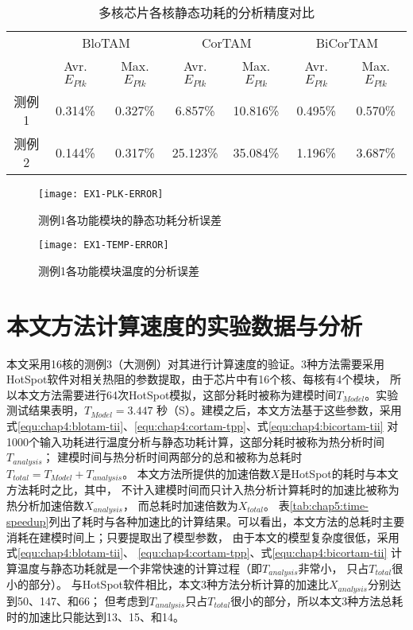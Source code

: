 \begin{table}
\centering
\caption{多核芯片各核静态功耗的分析精度对比}
\begin{tabular}{c c c c c c c}
\hline\hline
 & \multicolumn{2}{c}{BloTAM} & \multicolumn{2}{c}{CorTAM} & \multicolumn{2}{c}{BiCorTAM} \\
 & Avr.$E_{Plk}$ & Max.$E_{Plk}$ & Avr.$E_{Plk}$ & Max.$E_{Plk}$ & Avr.$E_{Plk}$ & Max.$E_{Plk}$ \\
\hline
测例1 & 0.314\% & 0.327\% & 6.857\% & 10.816\% & 0.495\% & 0.570\% \\
\hline
测例2 & 0.144\% & 0.317\% & 25.123\% & 35.084\% & 1.196\% & 3.687\% \\
\hline
\end{tabular}
\label{tab:chap5:power-leakage-error}
\end{table}


\begin{figure}[H]
  \centering
  \texttt{[image: EX1-PLK-ERROR]}
  \caption{测例1各功能模块的静态功耗分析误差}
  \label{fig:ex1-plk-error}
\end{figure}
\begin{figure}[H]
  \centering
  \texttt{[image: EX1-TEMP-ERROR]}
  \caption{测例1各功能模块温度的分析误差}
  \label{fig:ex1-temp-error}
\end{figure}


\section{本文方法计算速度的实验数据与分析}
\label{exp-speedup}
本文采用16核的测例3（大测例）对其进行计算速度的验证。3种方法需要采用HotSpot软件对相关热阻的参数提取，由于芯片中有16个核、每核有4个模块， 所以本文方法需要进行64次HotSpot模拟，这部分耗时被称为建模时间$T_{Model}$。实验测试结果表明，$T_{Model} = 3.447$ 秒（S）。建模之后，本文方法基于这些参数，采用式\ref{equ:chap4:blotam-tii}、\ref{equ:chap4:cortam-tpp}、式\ref{equ:chap4:bicortam-tii} 对1000个输入功耗进行温度分析与静态功耗计算，这部分耗时被称为热分析时间$T_{analysis}$； 建模时间与热分析时间两部分的总和被称为总耗时$T_{total}=T_{Model}+T_{analysis}$。 本文方法所提供的加速倍数$X$是HotSpot的耗时与本文方法耗时之比，其中， 不计入建模时间而只计入热分析计算耗时的加速比被称为热分析加速倍数$X_{analysis}$， 而总耗时加速倍数为$X_{total}$。
表\ref{tab:chap5:time-speedup}列出了耗时与各种加速比的计算结果。可以看出，本文方法的总耗时主要消耗在建模时间上；只要提取出了模型参数， 由于本文的模型复杂度很低，采用式\ref{equ:chap4:blotam-tii}、 \ref{equ:chap4:cortam-tpp}、式\ref{equ:chap4:bicortam-tii} 计算温度与静态功耗就是一个非常快速的计算过程（即$T_{analysis}$非常小， 只占$T_{total}$很小的部分）。 与HotSpot软件相比，本文3种方法分析计算的加速比$X_{analysis}$分别达到50、147、和66； 但考虑到$T_{analysis}$只占$T_{total}$很小的部分，所以本文3种方法总耗时的加速比只能达到13、15、和14。

